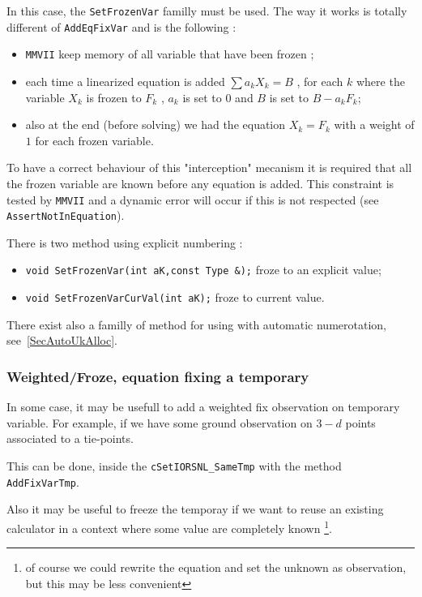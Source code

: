 In this case, the {\tt SetFrozenVar} familly must be used. The way it works is  totally
different of {\tt AddEqFixVar} and is the following :

\begin{itemize}
    \item {\tt MMVII} keep memory of all variable that have been frozen ;
    \item each time a linearized equation is added $\sum a_k X_k = B $ , for
             each $k$ where the variable $X_k$ is frozen to $F_k$ , $a_k$ is set to $0$ and $B$
             is set to $B - a_k F_k$;

    \item   also at the end (before solving) we had the equation $X_k=F_k$ with a weight of $1$
            for each frozen variable.
\end{itemize}

To have a correct behaviour of this "interception" mecanism it is required that all the frozen variable
are known before any equation is added. This constraint is tested by {\tt MMVII} and a dynamic
error will occur if this is not respected (see {\tt AssertNotInEquation}).

There is two method using explicit numbering :
\begin{itemize}
    \item {\tt void  SetFrozenVar(int aK,const  Type \&);} froze to an explicit value;
    \item {\tt void  SetFrozenVarCurVal(int aK);} froze to current value.
\end{itemize}

There exist also a familly of method for using with automatic numerotation, see~\ref{SecAutoUkAlloc}.



\subsubsection{Weighted/Froze, equation fixing a temporary}

\label{FrozeSetIORSNL}

In some case, it may be usefull to add a weighted fix observation  on temporary variable.
For example, if we have some ground observation on $3-d$ points associated to a tie-points.

This can be done, inside the {\tt cSetIORSNL\_SameTmp} with the method {\tt AddFixVarTmp}.

Also it may be useful to freeze the temporay if we want to reuse an existing calculator
in a context where some value are completely known \footnote{of course we could rewrite the
equation and set the unknown as observation, but this may be less convenient}.

